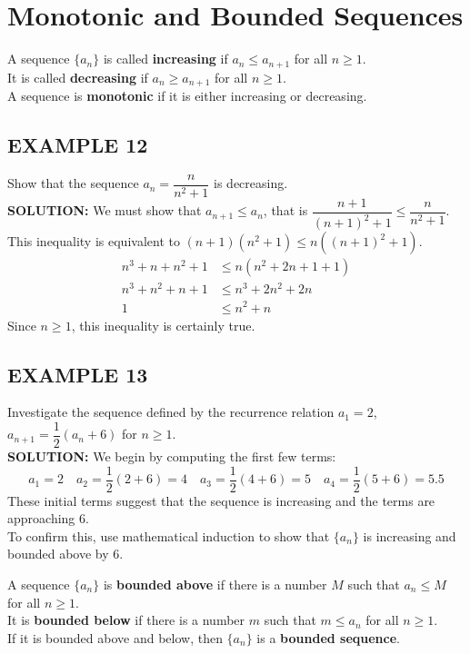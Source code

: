 \documentclass{article}
\theoremstyle{mystyle}
\begin{document}
\section*{Monotonic and Bounded Sequences}
\begin{tcolorbox}[colback=white, colframe=orange!80!white, title=Definitions, boxrule=0.5mm, arc=3mm]
A sequence \(\{a_n\}\) is called \textbf{increasing} if \(a_n \le a_{n+1}\) for all \(n \ge 1\). \\
It is called \textbf{decreasing} if \(a_n \ge a_{n+1}\) for all \(n \ge 1\). \\
A sequence is \textbf{monotonic} if it is either increasing or decreasing.
\end{tcolorbox}

\subsection*{EXAMPLE 12}
Show that the sequence \(a_n = \dfrac{n}{n^2+1}\) is decreasing.\\
\textbf{SOLUTION:}
We must show that \(a_{n+1} \le a_n\), that is \(\dfrac{n+1}{(n+1)^2+1} \le \dfrac{n}{n^2+1}\).
This inequality is equivalent to \((n+1)(n^2+1) \le n((n+1)^2+1)\).
\begin{align*}
    n^3 + n + n^2 + 1 &\le n(n^2 + 2n + 1 + 1) \\
    n^3 + n^2 + n + 1 &\le n^3 + 2n^2 + 2n \\
    1 &\le n^2 + n
\end{align*}
Since \(n \ge 1\), this inequality is certainly true.

\subsection*{EXAMPLE 13}
Investigate the sequence defined by the recurrence relation \(a_1 = 2\), \(a_{n+1} = \dfrac{1}{2}(a_n+6)\) for \(n \ge 1\).\\
\textbf{SOLUTION:}
We begin by computing the first few terms:
\[ a_1 = 2 \quad a_2 = \frac{1}{2}(2+6) = 4 \quad a_3 = \frac{1}{2}(4+6) = 5 \quad a_4 = \frac{1}{2}(5+6) = 5.5 \]
These initial terms suggest that the sequence is increasing and the terms are approaching 6.\\
To confirm this, use mathematical induction to show that \(\{a_n\}\) is increasing and bounded above by 6.

\begin{tcolorbox}[colback=white, colframe=orange!80!white, title=Definitions, boxrule=0.5mm, arc=3mm]
A sequence \(\{a_n\}\) is \textbf{bounded above} if there is a number \(M\) such that \(a_n \le M\) for all \(n \ge 1\). \\
It is \textbf{bounded below} if there is a number \(m\) such that \(m \le a_n\) for all \(n \ge 1\). \\
If it is bounded above and below, then \(\{a_n\}\) is a \textbf{bounded sequence}.
\end{tcolorbox}
\end{document}
